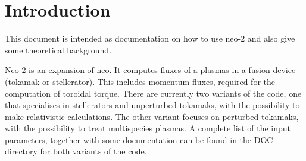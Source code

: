 \chapter{Introduction}
This document is intended as documentation on how to use neo-2 and also
give some theoretical background.

Neo-2 is an expansion of neo. It computes fluxes of a plasmas in a
fusion device (tokamak or stellerator). This includes momentum fluxes,
required for the computation of toroidal torque.
There are currently two variants of the code, one that specialises in
stellerators and unperturbed tokamaks, with the possibility to make
relativistic calculations.
The other variant focuses on perturbed tokamaks, with the possibility to
treat multispecies plasmas.
A complete list of the input parameters, together with some
documentation can be found in the DOC directory for both variants of the
code.
